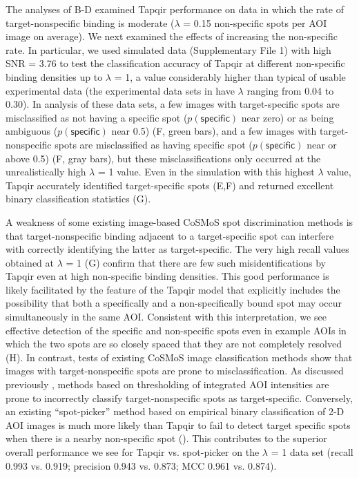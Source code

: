 The analyses of B-D examined Tapqir performance on data in which the rate of target-nonspecific binding is moderate ($\lambda$ = 0.15 non-specific spots per AOI image on average).  We next examined the effects of increasing the non-specific rate.  In particular, we used simulated data (Supplementary File 1) with high SNR = 3.76 to test the classification accuracy of Tapqir at different non-specific binding densities up to $\lambda$ = 1, a value considerably higher than typical of usable experimental data (the experimental data sets in  have $\lambda$ ranging from 0.04 to 0.30).   In analysis of these data sets, a few images with target-specific spots are misclassified as not having a specific spot ($p(\mathsf{specific})$ near zero) or as being ambiguous ($p(\mathsf{specific})$ near 0.5) (F, green bars), and a few images with target-nonspecific spots are misclassified as having specific spot ($p(\mathsf{specific})$ near or above 0.5) (F, gray bars), but these misclassifications only occurred at the unrealistically high $\lambda$ = 1 value.  Even in the simulation with this highest $\lambda$ value, Tapqir accurately identified target-specific spots (E,F) and returned excellent binary classification statistics (G). 

A weakness of some existing image-based CoSMoS spot discrimination methods is that target-nonspecific binding adjacent to a target-specific spot can interfere with correctly identifying the latter as target-specific.  The very high recall values obtained at $\lambda$ = 1 (G) confirm that there are few such misidentifications by Tapqir even at high non-specific binding densities.  This good performance is likely facilitated by the feature of the Tapqir model that explicitly includes the possibility that both a specifically and a non-specifically bound spot may occur simultaneously in the same AOI. Consistent with this interpretation, we see effective detection of the specific and non-specific spots even in example AOIs in which the two spots are so closely spaced that they are not completely resolved (H). In contrast, tests of existing CoSMoS image classification methods show that images with target-nonspecific spots are prone to misclassification.  As discussed previously \citep{Friedman2015-nx}, methods based on thresholding of integrated AOI intensities are prone to incorrectly classify target-nonspecific spots as target-specific.  Conversely, an existing ``spot-picker'' method based on empirical binary classification of 2-D AOI images \citep{Friedman2015-nx} is much more likely than Tapqir to fail to detect target specific spots when there is a nearby non-specific spot   ().  This contributes to the superior overall performance we see for Tapqir vs. spot-picker on the $\lambda$ = 1 data set (recall 0.993 vs. 0.919; precision 0.943 vs. 0.873; MCC 0.961 vs. 0.874).

